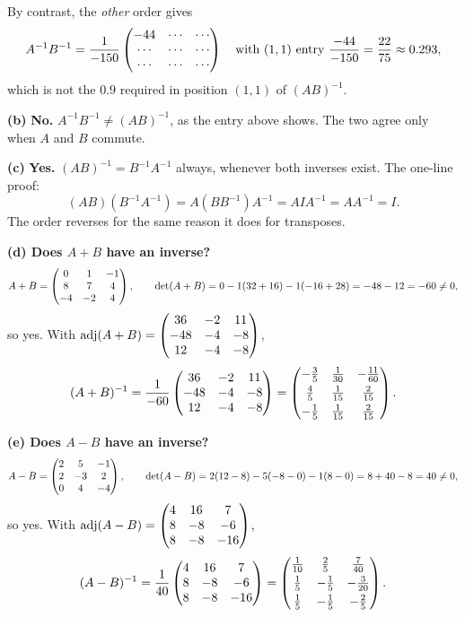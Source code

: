 \begin{solution}
\medskip
By contrast, the \emph{other} order gives
\[
A^{-1}B^{-1}=\frac{1}{-150}\begin{pmatrix}-44&\cdots&\cdots\\ \cdots&\cdots&\cdots\\ \cdots&\cdots&\cdots\end{pmatrix}
\quad\text{with }(1,1)\text{ entry }\frac{-44}{-150}=\frac{22}{75}\approx 0.293,
\]
which is not the $0.9$ required in position $(1,1)$ of $(AB)^{-1}$.

\medskip
\textbf{(b)} \textbf{No.} $A^{-1}B^{-1}\neq (AB)^{-1}$, as the entry above
shows. The two agree only when $A$ and $B$ commute.

\medskip
\textbf{(c)} \textbf{Yes.} $(AB)^{-1}=B^{-1}A^{-1}$ always, whenever both
inverses exist. The one-line proof:
\[
(AB)(B^{-1}A^{-1})=A(BB^{-1})A^{-1}=AIA^{-1}=AA^{-1}=I .
\]
The order reverses for the same reason it does for transposes.

\medskip
\textbf{(d) Does $A+B$ have an inverse?}
\[
A+B=\begin{pmatrix}0&1&-1\\8&7&4\\-4&-2&4\end{pmatrix},\qquad
\det(A+B)=0-1(32+16)-1(-16+28)=-48-12=-60\neq 0,
\]
so yes. With
$\operatorname{adj}(A+B)=\begin{pmatrix}36&-2&11\\-48&-4&-8\\12&-4&-8\end{pmatrix}$,
\[
(A+B)^{-1}=\frac{1}{-60}\begin{pmatrix}36&-2&11\\-48&-4&-8\\12&-4&-8\end{pmatrix}
=\begin{pmatrix}-\tfrac35&\tfrac1{30}&-\tfrac{11}{60}\\[3pt]
\tfrac45&\tfrac1{15}&\tfrac2{15}\\[3pt]
-\tfrac15&\tfrac1{15}&\tfrac2{15}\end{pmatrix}.
\]

\medskip
\textbf{(e) Does $A-B$ have an inverse?}
\[
A-B=\begin{pmatrix}2&5&-1\\2&-3&2\\0&4&-4\end{pmatrix},\qquad
\det(A-B)=2(12-8)-5(-8-0)-1(8-0)=8+40-8=40\neq 0,
\]
so yes. With
$\operatorname{adj}(A-B)=\begin{pmatrix}4&16&7\\8&-8&-6\\8&-8&-16\end{pmatrix}$,
\[
(A-B)^{-1}=\frac{1}{40}\begin{pmatrix}4&16&7\\8&-8&-6\\8&-8&-16\end{pmatrix}
=\begin{pmatrix}\tfrac1{10}&\tfrac25&\tfrac7{40}\\[3pt]
\tfrac15&-\tfrac15&-\tfrac3{20}\\[3pt]
\tfrac15&-\tfrac15&-\tfrac25\end{pmatrix}.
\]

\end{solution}

